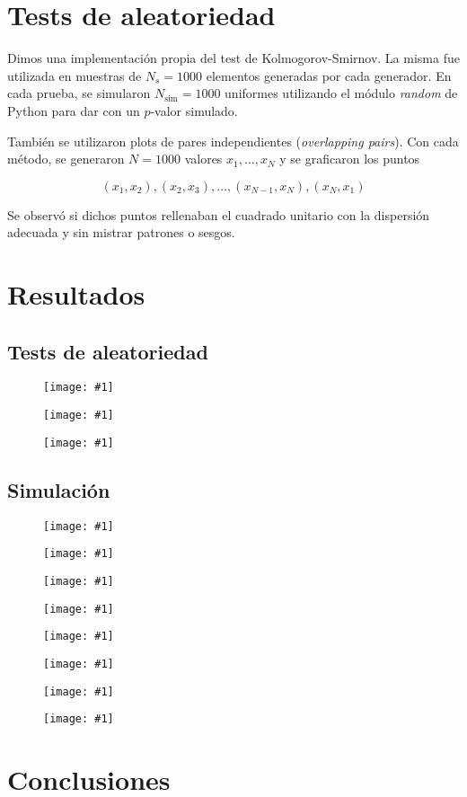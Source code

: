\documentclass[a4paper, 12pt]{article}
\newcommand{\insertimage}[1]{%
    \begin{figure}[hbtp!]
        \centering
        \texttt{[image: \#1]}
        \label{fig:#1}
    \end{figure}
}
\begin{document}
\section{Tests de aleatoriedad}

Dimos una implementación propia del test de Kolmogorov-Smirnov. La misma fue
utilizada en muestras de $N_s = 1000$ elementos generadas por cada generador. En
cada prueba, se simularon $N_{\text{sim}} = 1000$ uniformes utilizando el módulo
\textit{random} de Python para dar con un $p$-valor simulado. 

También se utilizaron plots de pares independientes (\textit{overlapping pairs}). Con cada método, se
generaron $N = 1000$ valores $x_1, \ldots, x_N$ y se graficaron los puntos

$$(x_1, x_2), (x_2, x_3), \ldots, (x_{N-1}, x_N), (x_N, x_1)$$

Se observó si dichos puntos rellenaban el cuadrado unitario con la dispersión
adecuada y sin mistrar patrones o sesgos.

\section{Resultados}

\subsection{Tests de aleatoriedad}

\insertimage{Media/test_GCL.png}
\insertimage{Media/test_XORShift.png}
\insertimage{Media/test_PCG.png}

\FloatBarrier

\subsection{Simulación}

\insertimage{Media/tiempos_de_ejecucion.png}
\insertimage{Media/distrib_tiempos_espera.png}
\insertimage{Media/promedio_tiempo_en_sis.png}
\insertimage{Media/evolucion_cola_tiempo.png}
\insertimage{Media/histograma_tiempos_espera.png}
\insertimage{Media/distribucion_del_tiempo_e_histograma_tiempo_servicio.png}
\insertimage{Media/porcentaje_servidor_ocupado.png}
\insertimage{Media/tasa_utilizacion_servidor_tiempo.png}

\FloatBarrier

\section{Conclusiones}
\end{document}
